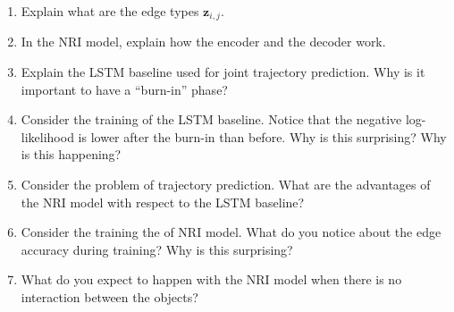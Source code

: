 \documentclass{article}
\begin{document}
\begin{enumerate}
	\item Explain what are the edge types $\mathbf{z}_{i,j}$.
	\item In the NRI model, explain how the encoder and the decoder work.
	\item Explain the LSTM baseline used for joint trajectory prediction. Why is it important to have a ``burn-in'' phase?
	\item Consider the training of the LSTM baseline. Notice that the negative log-likelihood is lower after the burn-in than before. Why is this surprising? Why is this happening?
	\item Consider the problem of trajectory prediction. What are the advantages of the NRI model with respect to the LSTM baseline? 
	\item Consider the training the of NRI model. What do you notice about the edge accuracy during training? Why is this surprising? 
	\item What do you expect to happen with the NRI model when there is no interaction between the objects?
\end{enumerate}
\end{document}
